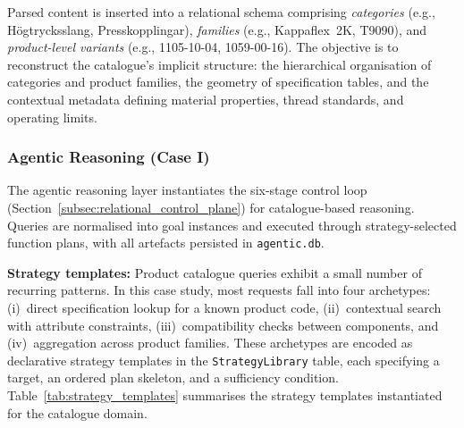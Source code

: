 \documentclass[largeformat]{interact}
\begin{document}
Parsed content is inserted into a relational schema comprising \textit{categories} (e.g., H\"ogtrycksslang, Presskopplingar), \textit{families} (e.g., Kappaflex~2K, T9090), and \textit{product-level variants} (e.g., 1105-10-04, 1059-00-16). The objective is to reconstruct the catalogue's implicit structure: the hierarchical organisation of categories and product families, the geometry of specification tables, and the contextual metadata defining material properties, thread standards, and operating limits.

\subsubsection{Agentic Reasoning (Case I)}
\label{subsubsec:agentic_reasoning}
The agentic reasoning layer instantiates the six-stage control loop (Section~\ref{subsec:relational_control_plane}) for catalogue-based reasoning. Queries are normalised into goal instances and executed through strategy-selected function plans, with all artefacts persisted in \texttt{agentic.db}.

\noindent \textbf{Strategy templates:}
Product catalogue queries exhibit a small number of recurring patterns. In this case study, most requests fall into four archetypes: (i)~direct specification lookup for a known product code, (ii)~contextual search with attribute constraints, (iii)~compatibility checks between components, and (iv)~aggregation across product families. These archetypes are encoded as declarative strategy templates in the \texttt{StrategyLibrary} table, each specifying a target, an ordered plan skeleton, and a sufficiency condition. Table~\ref{tab:strategy_templates} summarises the strategy templates instantiated for the catalogue domain.
\end{document}
